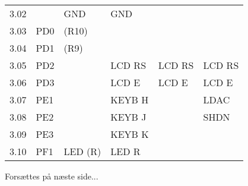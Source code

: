 \begin{table}[h!]
\begin{threeparttable}
\begin{tabular}{l l l l l l}
			3.02 &		& GND	& GND			&				&				\\
			3.03 & PD0	&(R10)	&				&				&				\\
			3.04 & PD1	&(R9)	&				&				&				\\
			3.05 & PD2	&		& LCD RS		& LCD RS		& LCD RS		\\
			3.06 & PD3	&		& LCD E			& LCD E			& LCD E			\\
			3.07 & PE1	&		& KEYB H		& 				& LDAC			\\
			3.08 & PE2	&		& KEYB J		&				& SHDN			\\
			3.09 & PE3	&		& KEYB K		&				&				\\
			3.10 & PF1	&LED (R)& LED R			&				&				\\
			\bottomrule
		\end{tabular}
	
		\begin{tablenotes}
			\item[] Forsættes på næste side...
		\end{tablenotes}
	\end{threeparttable}
\end{table}
\newpage

